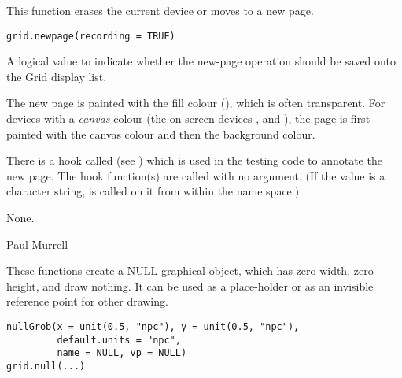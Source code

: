 %
\begin{Description}\relax
This function erases the current device or moves to a new page.
\end{Description}
%
\begin{Usage}
\begin{verbatim}
grid.newpage(recording = TRUE)
\end{verbatim}
\end{Usage}
%
\begin{Arguments}
\begin{ldescription}
\item[\code{recording}] A logical value to indicate whether the new-page
operation should be saved onto the Grid display list.
\end{ldescription}
\end{Arguments}
%
\begin{Details}\relax
The new page is painted with the fill colour
(), which is often transparent.  For devices
with a \emph{canvas} colour (the on-screen devices ,
 and ), the page is first painted with the
canvas colour and then the background colour.

There is a hook called  (see )
which is used in the testing code to annotate the new page.  The hook
function(s) are called with no argument.  (If the value is a character
string,  is called on it from within the 
name space.)
\end{Details}
%
\begin{Value}
None.
\end{Value}
%
\begin{Author}\relax
Paul Murrell
\end{Author}
%
\begin{SeeAlso}\relax
{}
\end{SeeAlso}
%
\begin{Description}\relax
These functions create a NULL graphical object,
which has zero width, zero height, and draw nothing.
It can be used as a place-holder or as an invisible
reference point for other drawing.
\end{Description}
%
\begin{Usage}
\begin{verbatim}
nullGrob(x = unit(0.5, "npc"), y = unit(0.5, "npc"),
         default.units = "npc",
         name = NULL, vp = NULL)
grid.null(...)
\end{verbatim}
\end{Usage}
